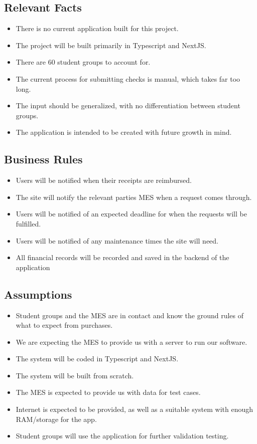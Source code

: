 \documentclass[12pt]{article}
\begin{document}
\subsection{Relevant Facts}
\begin{itemize}
  \item There is no current application built for this project.
  \item The project will be built primarily in Typescript and NextJS.
  \item There are 60 student groups to account for.
  \item The current process for submitting checks is manual, which takes far too long.
  \item The input should be generalized, with no differentiation between student groups.
  \item The application is intended to be created with future growth in mind.
\end{itemize}



\subsection{Business Rules}
\begin{itemize}
  \item Users will be notified when their receipts are reimbursed.
  \item The site will notify the relevant parties MES when a request comes through.
  \item Users will be notified of an expected deadline for when the requests will be fulfilled.
  \item Users will be notified of any maintenance times the site will need.
  \item All financial records will be recorded and saved in the backend of the application 
\end{itemize}

\subsection{Assumptions}
\begin{itemize}
  \item Student groups and the MES are in contact and know the ground rules of what to expect from purchases.
  \item We are expecting the MES to provide us with a server to run our software.
  \item The system will be coded in Typescript and NextJS.
  \item The system will be built from scratch.
  \item The MES is expected to provide us with data for test cases.
  \item Internet is expected to be provided, as well as a suitable system with enough RAM/storage for the app. 
  \item Student groups will use the application for further validation testing. 
\end{itemize}
\end{document}
